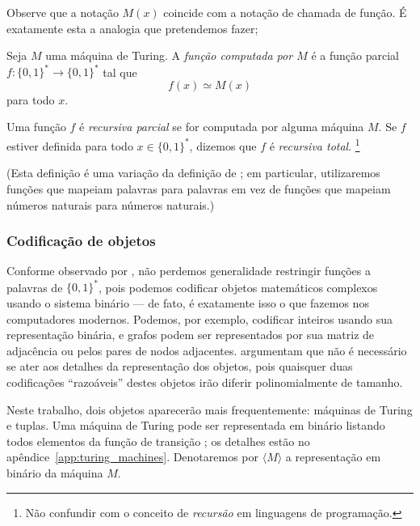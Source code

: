 Observe que a notação $M(x)$ coincide com a notação de chamada de função.
É exatamente esta a analogia que pretendemos fazer;

\begin{definition}
    \label{def:recursive_function}
    Seja $M$ uma máquina de Turing.
    A \emph{função computada por $M$}
    é a função parcial $f: \{0, 1\}^* \to \{0, 1\}^*$ tal que
    \begin{equation*}
        f(x) \simeq M(x)
    \end{equation*}
    para todo $x$.

    Uma função $f$ é \emph{recursiva parcial}
    se for computada por alguma máquina $M$.
    Se $f$ estiver definida para todo $x \in \{0, 1\}^*$,
    dizemos que $f$ é \emph{recursiva total}.
    \footnote{
        Não confundir com o conceito de \emph{recursão} em linguagens de programação.
    }
\end{definition}
(Esta definição é uma variação da definição de ;
em particular, utilizaremos funções que mapeiam palavras para palavras
em vez de funções que mapeiam números naturais para números naturais.)

\subsubsection{Codificação de objetos}
\label{sec:binary_encoding}

Conforme observado por ,
não perdemos generalidade restringir funções a palavras de $\{0, 1\}^*$,
pois podemos codificar objetos matemáticos complexos usando o sistema binário
--- de fato,
é exatamente isso o que fazemos nos computadores modernos.
Podemos, por exemplo,
codificar inteiros usando sua representação binária,
e grafos podem ser representados por sua matriz de adjacência
ou pelos pares de nodos adjacentes.
 argumentam que
não é necessário se ater aos detalhes da representação dos objetos,
pois quaisquer duas codificações ``razoáveis'' destes objetos
irão diferir polinomialmente de tamanho.

Neste trabalho,
dois objetos aparecerão mais frequentemente:
máquinas de Turing e tuplas.
Uma máquina de Turing pode ser representada em binário
listando todos elementos da função de transição
\cite[p.~182]{HopcroftUllman1979};
os detalhes estão no apêndice~\ref{app:turing_machines}.
Denotaremos por $\langle M \rangle$ a representação em binário da máquina $M$.

